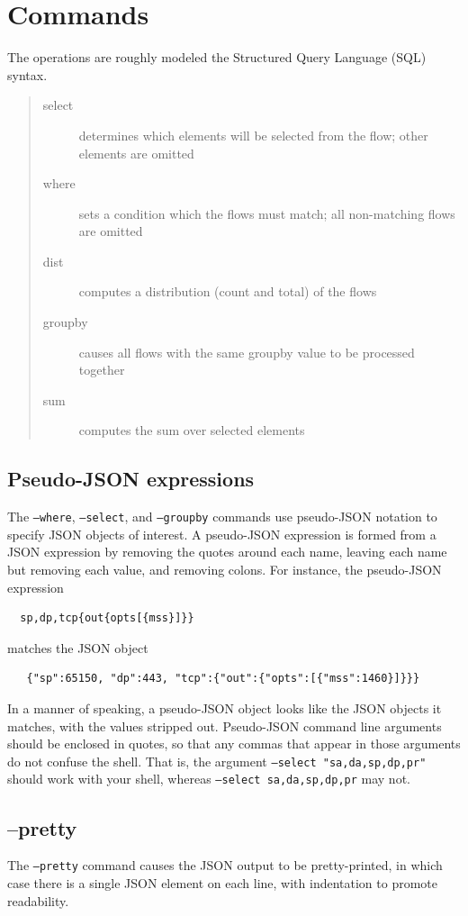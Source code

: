 \documentclass{book}
\begin{document}
\section{Commands}
The operations are roughly modeled the Structured Query Language (SQL) syntax.  
\begin{quote}
\begin{description}
\item [select] determines which elements will be selected from the flow; other elements
are omitted
\item [where] sets a condition which the flows must match; all non-matching flows are omitted
\item [dist] computes a distribution (count and total) of the flows
\item [groupby] causes all flows with the same groupby value to be processed together   
\item [sum] computes the sum over selected elements
\end{description}
\end{quote}

\subsection{Pseudo-JSON expressions}
The \texttt{--where}, \texttt{--select}, and \texttt{--groupby}
commands use pseudo-JSON notation to specify JSON objects of interest.
A pseudo-JSON expression is formed from a JSON expression by removing
the quotes around each name, leaving each name but removing each
value, and removing colons.  For instance, the pseudo-JSON expression
\begin{verbatim}
  sp,dp,tcp{out{opts[{mss}]}}
\end{verbatim}
matches the JSON object
\begin{verbatim}
   {"sp":65150, "dp":443, "tcp":{"out":{"opts":[{"mss":1460}]}}}
\end{verbatim}
In a manner of speaking, a pseudo-JSON object looks like the JSON
objects it matches, with the values stripped out.  Pseudo-JSON
command line arguments should be enclosed in quotes, so that any
commas that appear in those arguments do not confuse the shell.
That is, the argument \texttt{--select "sa,da,sp,dp,pr"} should work with
your shell, whereas \texttt{--select sa,da,sp,dp,pr} may not.

\subsection{--pretty}
The \texttt{--pretty} command causes the JSON output to be pretty-printed,
in which case there is a single JSON element on each line, with
indentation to promote readability.
\end{document}

